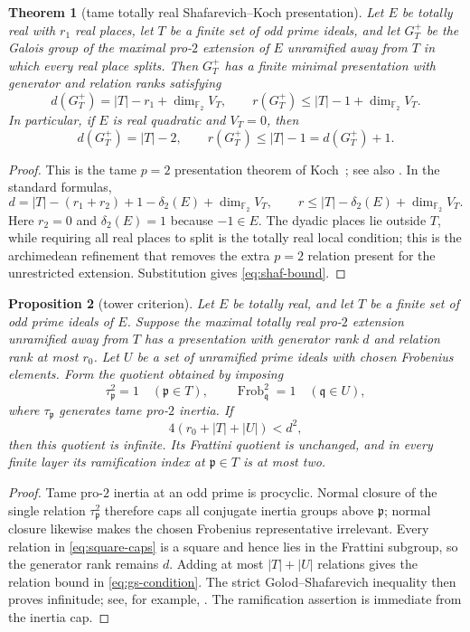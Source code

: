 \documentclass[11pt]{article}
\newtheorem{theorem}{Theorem}[section]
\newtheorem{proposition}[theorem]{Proposition}
\theoremstyle{definition}
\theoremstyle{remark}
\newcommand{\F}{\mathbb F}
\begin{document}
\begin{theorem}[tame totally real Shafarevich--Koch presentation]
\label{thm:shafarevich}
Let $E$ be totally real with $r_1$ real places, let $T$ be a finite set of
odd prime ideals, and let $G_T^+$ be the Galois group of the maximal pro-$2$
extension of $E$ unramified away from $T$ in which every real place splits.
Then $G_T^+$ has a finite minimal presentation with generator and relation
ranks satisfying
\[
 d(G_T^+)=|T|-r_1+\dim_{\F_2}V_T,
 \qquad
 r(G_T^+)\le |T|-1+\dim_{\F_2}V_T.               \tag{3.2}
\]
In particular, if $E$ is real quadratic and $V_T=0$, then
\[
 d(G_T^+)=|T|-2,\qquad r(G_T^+)\le |T|-1=d(G_T^+)+1. \tag{3.3}\label{eq:shaf-bound}
\]
\end{theorem}

\begin{proof}
This is the tame $p=2$ presentation theorem of
Koch~\cite[Theorems~11.5 and~11.8]{Koch2002}; see also
\cite[Section~10.7]{NSW2008}.  In the standard formulas,
\[
 d=|T|-(r_1+r_2)+1-\delta_2(E)+\dim_{\F_2}V_T,
 \qquad
 r\le |T|-\delta_2(E)+\dim_{\F_2}V_T.
\]
Here $r_2=0$ and $\delta_2(E)=1$ because $-1\in E$.  The dyadic places lie
outside $T$, while requiring all real places to split is the totally real
local condition; this is the archimedean refinement that removes the extra
$p=2$ relation present for the unrestricted extension.  Substitution gives
\eqref{eq:shaf-bound}.
\end{proof}

\begin{proposition}[tower criterion]\label{prop:tower}
Let $E$ be totally real, and let $T$ be a finite set of odd prime ideals of
$E$.  Suppose the maximal totally real pro-$2$ extension unramified away
from $T$ has a presentation with generator rank $d$ and relation rank at
most $r_0$.  Let $U$ be a set of unramified prime ideals with chosen
Frobenius elements.  Form the quotient obtained by imposing
\[
 \tau_{\mathfrak p}^2=1\quad(\mathfrak p\in T),
 \qquad
 \operatorname{Frob}_{\mathfrak q}^2=1\quad(\mathfrak q\in U),         \tag{3.4}\label{eq:square-caps}
\]
where $\tau_{\mathfrak p}$ generates tame pro-$2$ inertia.  If
\[
 4(r_0+|T|+|U|)<d^2,                              \tag{3.5}\label{eq:gs-condition}
\]
then this quotient is infinite.  Its Frattini quotient is unchanged, and
in every finite layer its ramification index at $\mathfrak p\in T$ is at
most two.
\end{proposition}

\begin{proof}
Tame pro-$2$ inertia at an odd prime is procyclic.  Normal closure of the
single relation $\tau_{\mathfrak p}^2$ therefore caps all conjugate inertia
groups above $\mathfrak p$; normal closure likewise makes the chosen
Frobenius representative irrelevant.  Every relation in
\eqref{eq:square-caps} is a square and hence lies in the Frattini subgroup,
so the generator rank remains $d$.
Adding at most $|T|+|U|$ relations gives the relation bound in
\eqref{eq:gs-condition}.  The strict Golod--Shafarevich inequality then proves
infinitude; see, for example, \cite{Ershov2012}.  The ramification assertion
is immediate from the inertia cap.
\end{proof}
\end{document}
